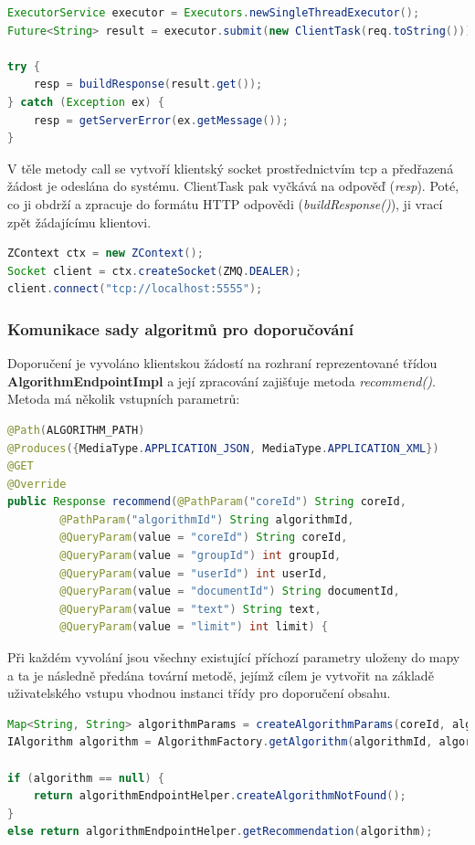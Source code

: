 \documentclass[thesis=M,czech]{FITthesis}[2014/05/07]
\begin{document}
\begin{lstlisting}[language=java]
ExecutorService executor = Executors.newSingleThreadExecutor();
Future<String> result = executor.submit(new ClientTask(req.toString()));

try {
    resp = buildResponse(result.get());
} catch (Exception ex) {
    resp = getServerError(ex.getMessage());
}
\end{lstlisting}

V těle metody call se vytvoří klientský socket prostřednictvím tcp a předřazená žádost je odeslána do systému. ClientTask pak vyčkává na odpověď (\emph{resp}). Poté, co ji obdrží a zpracuje do formátu HTTP odpovědi (\emph{buildResponse()}), ji vrací zpět žádajícímu klientovi. 

\begin{lstlisting}[language=java]
ZContext ctx = new ZContext();
Socket client = ctx.createSocket(ZMQ.DEALER);
client.connect("tcp://localhost:5555");
\end{lstlisting}

\subsubsection{Komunikace sady algoritmů pro doporučování}
\label{sec:algcom}
Doporučení je vyvoláno klientskou žádostí na rozhraní reprezentované třídou \textbf{AlgorithmEndpointImpl} a její zpracování zajišťuje metoda \emph{recommend()}. Metoda má několik vstupních parametrů:

\begin{lstlisting}[language=java]
@Path(ALGORITHM_PATH)
@Produces({MediaType.APPLICATION_JSON, MediaType.APPLICATION_XML})
@GET
@Override
public Response recommend(@PathParam("coreId") String coreId,
        @PathParam("algorithmId") String algorithmId,
        @QueryParam(value = "coreId") String coreId,
        @QueryParam(value = "groupId") int groupId,
        @QueryParam(value = "userId") int userId,
        @QueryParam(value = "documentId") String documentId,
        @QueryParam(value = "text") String text,
        @QueryParam(value = "limit") int limit) {
\end{lstlisting}

Při každém vyvolání jsou všechny existující příchozí parametry uloženy do mapy a ta je následně předána tovární metodě, jejímž cílem je vytvořit na základě uživatelského vstupu vhodnou instanci třídy pro doporučení obsahu.

\begin{lstlisting}[language=java]
Map<String, String> algorithmParams = createAlgorithmParams(coreId, algorithmId, groupId, userId, documentId, text, limit);
IAlgorithm algorithm = AlgorithmFactory.getAlgorithm(algorithmId, algorithmParams);

if (algorithm == null) {
    return algorithmEndpointHelper.createAlgorithmNotFound();
}
else return algorithmEndpointHelper.getRecommendation(algorithm);
\end{lstlisting}
\end{document}
